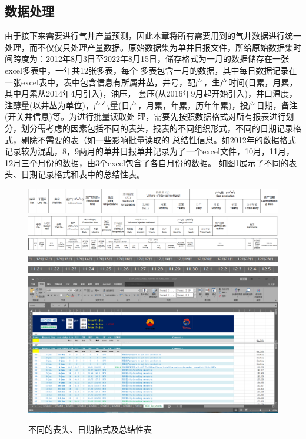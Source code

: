 \subsection{数据处理}
\label{cha:data}
由于接下来需要进行气井产量预测，因此本章将所有需要用到的气井数据进行统一处理，而不仅仅只处理产量数据。原始数据集为单井日报文件，所给原始数据集时间跨度为：2012年8月3日至2022年8月15日，储存格式为一月的数据储存在一张excel多表中，一年共12张多表，每个
多表包含一月的数据，其中每日数据记录在一张excel表中，表中包含信息有所属井丛，井号，配产，生产时间(日累，月累，其中月累从2014年4月引入)，油压，
套压(从2016年9月起开始引入)，井口温度，注醇量(以井丛为单位)，产气量(日产，月累，年累，历年年累)，投产日期，备注(开关井信息)等。为进行批量读取处
理，需要先按照数据格式对所有报表进行划分，划分需考虑的因素包括不同的表头，报表的不同组织形式，不同的日期记录格式，剔除不需要的表（如一些影响批量读取的
总结性信息。如2012年的数据格式记录较为混乱，8，9两月的单井日报单井记录为了一个excel文件，10月，11月，12月三个月份的数据，由3个excel包含了各自月份的数据。
如图\ref{fig:difTable}展示了不同的表头、日期记录格式和表中的总结性表。
\begin{figure}[H]
    \centering
    \includegraphics[scale=0.3,angle=0]{figure/表头1.png}
    \hfil
    \includegraphics[scale=0.3,angle=0]{figure/表头2.png}
    \hfil
    \includegraphics[scale=0.25,angle=0]{figure/表头3.png}
    \hfil
    \includegraphics[scale=0.3,angle=0]{figure/日期格式1.png}
    \hfil
    \includegraphics[scale=0.3,angle=0]{figure/日期格式2.png}
    \hfil
    \includegraphics[scale=0.3,angle=0]{figure/总结性表.png}
    \caption{不同的表头、日期格式及总结性表}
    \label{fig:difTable}
\end{figure}

